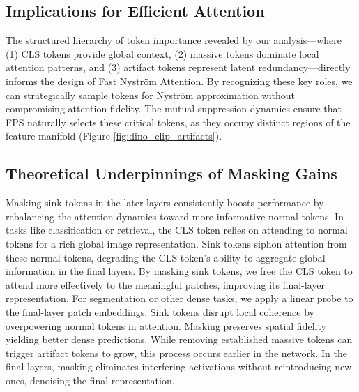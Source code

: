 \subsection{Implications for Efficient Attention}


The structured hierarchy of token importance revealed by our analysis—where (1) CLS tokens provide global context, (2) massive tokens dominate local attention patterns, and (3) artifact tokens represent latent redundancy—directly informs the design of Fast Nyström Attention. By recognizing these key roles, we can strategically sample tokens for Nyström approximation without compromising attention fidelity. The mutual suppression dynamics ensure that FPS naturally selects these critical tokens, as they occupy distinct regions of the feature manifold (Figure \ref{fig:dino_clip_artifacts}).


\subsection{Theoretical Underpinnings of Masking Gains}
Masking sink tokens in the later layers consistently boosts performance by rebalancing the attention dynamics toward more informative normal tokens. In tasks like classification or retrieval, the CLS token relies on attending to normal tokens for a rich global image representation. Sink tokens siphon attention from these normal tokens, degrading the CLS token’s ability to aggregate global information in the final layers. By masking sink tokens, we free the CLS token to attend more effectively to the meaningful patches, improving its final-layer representation. For segmentation or other dense tasks, we apply a linear probe to the final-layer patch embeddings. Sink tokens disrupt local coherence by overpowering normal tokens in attention. Masking preserves spatial fidelity yielding better dense predictions. While removing established massive tokens can trigger artifact tokens to grow, this process occurs earlier in the network. In the final layers, masking eliminates interfering activations without reintroducing new ones, denoising the final representation.




